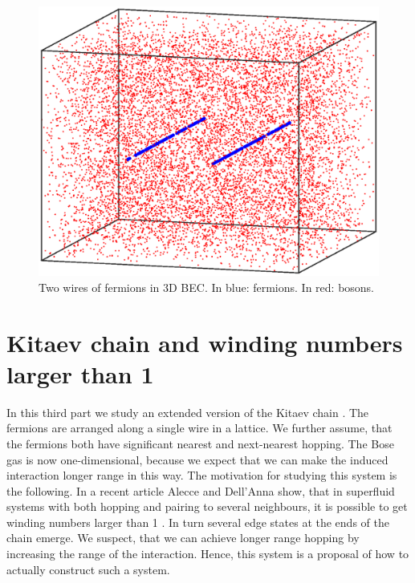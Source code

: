 \documentclass[11pt, twoside]{Thesis}
\begin{document}
\vspace{2.5cm}

\begin{figure}[H]
\center
\includegraphics[width=0.8\columnwidth]{gasandwires3.eps}
\\ Two wires of fermions in 3D BEC. In blue: fermions. In red: bosons.  
\end{figure}

\newpage


 
 
 

\part{Kitaev chain and winding numbers larger than 1}
In this third part we study an extended version of the Kitaev chain \cite{KitaevQuantumWires}. The fermions are arranged along a single wire in a lattice. We further assume, that the fermions both have significant nearest and next-nearest hopping. The Bose gas is now one-dimensional, because we expect that we can make the induced interaction longer range in this way. The motivation for studying this system is the following. In a recent article Alecce and Dell'Anna show, that in superfluid systems with both hopping and pairing to several neighbours, it is possible to get winding numbers larger than 1 \cite{Alecce.extendKitaev}. In turn several edge states at the ends of the chain emerge. We suspect, that we can achieve longer range hopping by increasing the range of the interaction. Hence, this system is a proposal of how to actually construct such a system. 

\vspace{2.5cm}
\end{document}
